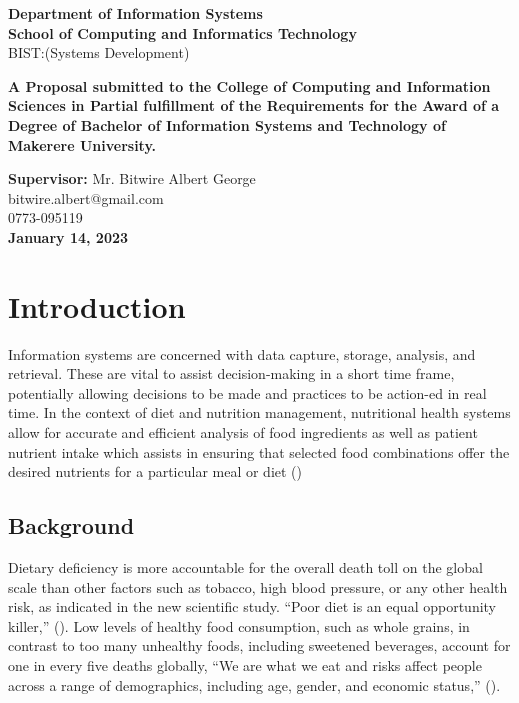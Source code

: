 \documentclass{article}
\begin{document}
\begin{center}
\begin{center}
\textbf{Department of Information Systems}\\
\textbf{School of Computing and Informatics Technology}
\\ BIST:(Systems Development)
\end{center}

\begin{center}
\textbf{A Proposal submitted to the College of Computing and Information Sciences in Partial fulfillment of the Requirements for the Award of a Degree of Bachelor of Information Systems and Technology of Makerere University.}
\end{center}

\vspace{3pt} 
\textbf{Supervisor:} Mr. Bitwire Albert George \\
 bitwire.albert@gmail.com \\ 0773-095119 \\

\vspace{25pt} 
\textbf{January 14, 2023}
\end{center}

\newpage
\tableofcontents
\newpage
\listoftables
\newpage
\listoffigures
\newpage

\section{Introduction}
\label{Introducion}
Information systems are concerned with data capture, storage, analysis, and retrieval. These are vital to assist decision-making in a short time frame, potentially allowing decisions to be made and practices to be action-ed in real time.  In the context of diet and nutrition management, nutritional health systems allow for accurate and efficient analysis of food ingredients as well as patient nutrient intake which assists in ensuring that selected food combinations offer the desired nutrients for a particular meal or diet (\cite{DFM})


\subsection{Background}
\label{Background}
Dietary deficiency is more accountable for the overall death toll on the global scale than other factors such as tobacco, high blood pressure, or any other health risk, as indicated in the new scientific study. “Poor diet is an equal opportunity killer,” (\cite{ihme2019new}). Low levels of healthy food consumption, such as whole grains, in contrast to too many unhealthy foods, including sweetened beverages, account for one in every five deaths globally, “We are what we eat and risks affect people across a range of demographics, including age, gender, and economic status,” (\cite{ihme2019new}).
\end{document}
